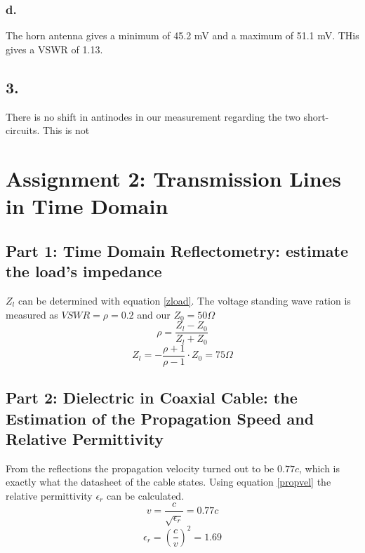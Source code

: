 \documentclass{article}
\begin{document}
	\subsubsection*{d.}
	The horn antenna gives a minimum of 45.2 mV and a maximum of 51.1 mV. THis gives a VSWR of 1.13.
	
	\subsection*{3.}
	There is no shift in antinodes in our measurement regarding the two short-circuits. This is not 
	
	
	
	\section*{Assignment 2: Transmission Lines in Time Domain}
		\subsection*{Part 1: Time Domain Reflectometry: estimate the load’s impedance}
			$Z_l$ can be determined with equation \ref{zload}. The voltage standing wave ration is measured as $VSWR = \rho = 0.2$ and our $Z_0 = 50 \Omega$
			\begin{equation}
			\label{zload}
				\rho = \frac{Z_l-Z_0}{Z_l+Z_0}
			\end{equation}
			\begin{equation}
				Z_l = - \frac{\rho + 1}{\rho - 1} \cdot Z_0 = 75 \Omega
			\end{equation}
	
		\subsection*{Part 2:  Dielectric in Coaxial Cable: the Estimation of the Propagation Speed and Relative Permittivity}
			From the reflections the propagation velocity turned out to be $0.77c$, which is exactly what the datasheet of the cable states\cite{datasheetcable}. 
			Using equation \ref{propvel} the relative permittivity $\epsilon_r$ can be calculated.
			\begin{equation}
			\label{propvel}
				v = \frac{c}{\sqrt{\epsilon_r}} = 0.77 c
			\end{equation}
			\begin{equation}
				\epsilon_r = (\frac{c}{v})^2 = 1.69
			\end{equation}


	\clearpage
	
	
\end{document}
